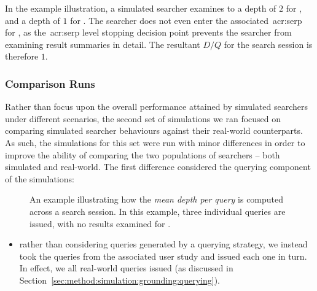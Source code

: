 In the example illustration, a simulated searcher examines to a depth of $2$ for , and a depth of $1$ for . The searcher does not even enter the associated~\gls{acr:serp} for , as the~\gls{acr:serp} level stopping decision point prevents the searcher from examining result summaries in detail. The resultant $D/Q$ for the search session is therefore $1$.

\vspace*{-4mm}
\subsubsection{Comparison Runs}\label{sec:method:simulation:runs:comparison}
Rather than focus upon the overall performance attained by simulated searchers under different scenarios, the second set of simulations we ran focused on comparing simulated searcher behaviours against their real-world counterparts. As such, the simulations for this set were run with minor differences in order to improve the ability of comparing the two populations of searchers -- both simulated and real-world. The first difference considered the querying component of the simulations:

\begin{figure}[t!]
    \centering
    \caption[Example depth per query computation]{An example illustrating how the \emph{mean depth per query} is computed across a search session. In this example, three individual queries are issued, with no results examined for .}
    \label{fig:depth_per_query}
\end{figure}

\begin{itemize}
    \item{rather than considering queries generated by a querying strategy, we instead took the queries from the associated user study and issued each one in turn. In effect, we  all real-world queries issued (as discussed in Section~\ref{sec:method:simulation:grounding:querying}).}
\end{itemize}

